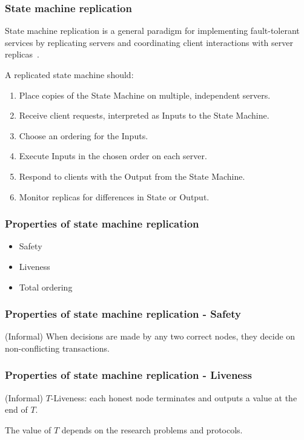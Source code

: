 \documentclass{beamer}
\begin{document}
\begin{frame}
\frametitle{State machine replication}

State machine replication is a general paradigm for implementing fault-tolerant services by replicating servers and coordinating client interactions with server replicas~\cite{schneider1990implementing}.

A replicated state machine should:

\begin{enumerate}
    \item Place copies of the State Machine on multiple, independent servers.
    \item Receive client requests, interpreted as Inputs to the State Machine.
    \item Choose an ordering for the Inputs.
    \item Execute Inputs in the chosen order on each server.
    \item Respond to clients with the Output from the State Machine.
    \item Monitor replicas for differences in State or Output.
\end{enumerate}




\end{frame}

\begin{frame}
\frametitle{Properties of state machine replication}

\begin{itemize}
    \item Safety
    \item Liveness
    \item Total ordering
\end{itemize}

\end{frame}

\begin{frame}
\frametitle{Properties of state machine replication - Safety}

(Informal) When decisions are made by any two correct nodes, they decide on non-conflicting transactions.

\end{frame}

\begin{frame}
\frametitle{Properties of state machine replication - Liveness}

(Informal) $T$-Liveness: each honest node terminates and outputs a value at the end of $T$.

The value of $T$ depends on the research problems and protocols.

\end{frame}
\end{document}
